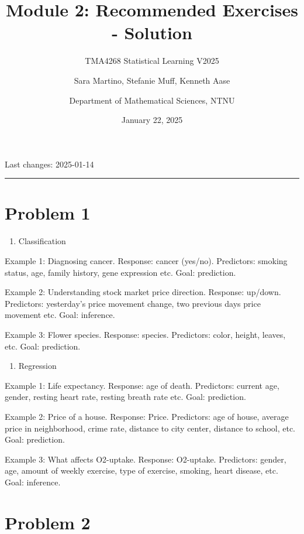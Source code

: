 \documentclass[
]{article}
\title{Module 2: Recommended Exercises - Solution}
\subtitle{TMA4268 Statistical Learning V2025}
\author{Sara Martino, Stefanie Muff, Kenneth Aase \and Department of
Mathematical Sciences, NTNU}
\date{January 22, 2025}
\providecommand{\tightlist}{%
  \setlength{\itemsep}{0pt}\setlength{\parskip}{0pt}}
\begin{document}
\maketitle

Last changes: 2025-01-14

\begin{center}\rule{0.5\linewidth}{0.5pt}\end{center}

\section{Problem 1}\label{problem-1}

\begin{enumerate}
\def\labelenumi{\alph{enumi})}
\tightlist
\item
  Classification
\end{enumerate}

Example 1: Diagnosing cancer. Response: cancer (yes/no). Predictors:
smoking status, age, family history, gene expression etc. Goal:
prediction.

Example 2: Understanding stock market price direction. Response:
up/down. Predictors: yesterday's price movement change, two previous
days price movement etc. Goal: inference.

Example 3: Flower species. Response: species. Predictors: color, height,
leaves, etc. Goal: prediction.

\begin{enumerate}
\def\labelenumi{\alph{enumi})}
\setcounter{enumi}{1}
\tightlist
\item
  Regression
\end{enumerate}

Example 1: Life expectancy. Response: age of death. Predictors: current
age, gender, resting heart rate, resting breath rate etc. Goal:
prediction.

Example 2: Price of a house. Response: Price. Predictors: age of house,
average price in neighborhood, crime rate, distance to city center,
distance to school, etc. Goal: prediction.

Example 3: What affects O2-uptake. Response: O2-uptake. Predictors:
gender, age, amount of weekly exercise, type of exercise, smoking, heart
disease, etc. Goal: inference.

\section{Problem 2}\label{problem-2}
\end{document}
